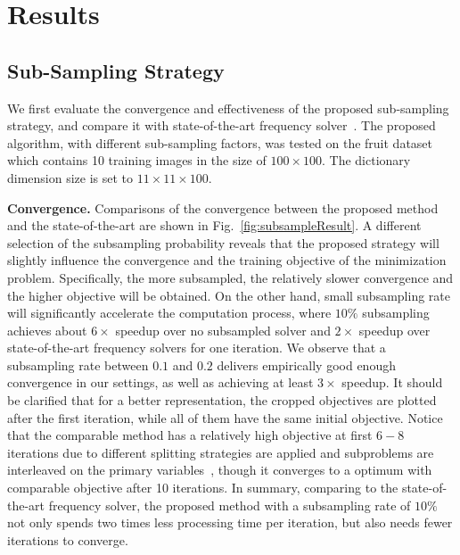 \section{Results} \label{sec:result}
\subsection{Sub-Sampling Strategy}
We first evaluate the convergence and effectiveness of the proposed sub-sampling strategy, and compare it with state-of-the-art frequency solver~\cite{heide2015fast}. The proposed algorithm, with different sub-sampling factors, was tested on the fruit dataset~\cite{zeiler2010deconvolutional} which contains 10 training images in the size of $100 \times 100$. The dictionary dimension size is set to $11 \times 11 \times 100$.

{\bfseries Convergence.} Comparisons of the convergence between the proposed method and the state-of-the-art are shown in Fig.~\ref{fig:subsampleResult}. A different selection of the subsampling probability reveals that the proposed strategy will slightly influence the convergence and the training objective of the minimization problem. Specifically, the more subsampled, the relatively slower convergence and the higher objective will be obtained. On the other hand, small subsampling rate will significantly accelerate the computation process, where $10\%$ subsampling achieves about $6 \times$ speedup over no subsampled solver and $2 \times$ speedup over state-of-the-art frequency solvers for one iteration. We observe that a subsampling rate between $0.1$ and $0.2$ delivers empirically good enough convergence in our settings, as well as achieving at least $3 \times$ speedup. It should be clarified that for a better representation, the cropped objectives are plotted after the first iteration, while all of them have the same initial objective. Notice that the comparable method has a relatively high objective at first $6-8$ iterations due to different splitting strategies are applied and subproblems are interleaved on the primary variables~\cite{wohlberg2016efficient}, though it converges to a optimum with comparable objective after 10 iterations. In summary, comparing to the state-of-the-art frequency solver, the proposed method with a subsampling rate of $10\%$ not only spends two times less processing time per iteration, but also needs fewer iterations to converge.

